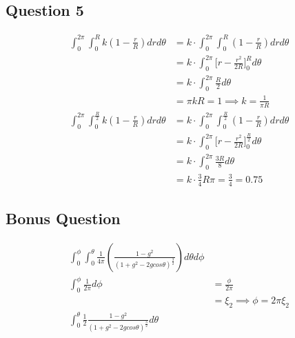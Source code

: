 \documentclass{article}
\begin{document}
\newpage
\subsection*{Question 5}
\begin{align}
    \int_0^{2\pi} \int_0^R k(1-\frac{r}{R})drd\theta & = k\cdot \int_0^{2\pi} \int_0^R (1-\frac{r}{R})drd\theta\\
    & = k\cdot \int_0^{2\pi} \lbrack r - \frac{r^2}{2R}\rbrack ^R_0 d\theta\\
    & = k\cdot \int_0^{2\pi} \frac{R}{2} d\theta\\
    & = \pi kR = 1 \implies k = \frac{1}{\pi R}\\
    \int_0^{2\pi} \int_0^{\frac{R}{2}} k(1-\frac{r}{R})drd\theta & = k\cdot \int_0^{2\pi} \int_0^{\frac{R}{2}} (1-\frac{r}{R})drd\theta\\
    & = k\cdot \int_0^{2\pi} \lbrack r - \frac{r^2}{2R}\rbrack ^{\frac{R}{2}}_0 d\theta\\
    & = k\cdot \int_0^{2\pi} \frac{3R}{8} d\theta\\
    & = k\cdot \frac{3}{4}R\pi = \frac{3}{4} = 0.75
\end{align}

\newpage
\subsection*{Bonus Question}
\begin{align}
    \int_0^{\phi} \int_0^{\theta} \frac{1}{4\pi} (\frac{1-g^2}{(1+g^2-2gcos\theta)^{\frac{3}{2}}}) d\theta d\phi\\
    \int_0^{\phi} \frac{1}{2\pi} d\phi &= \frac{\phi}{2\pi}\\
    &= \xi_2 \implies \phi=2\pi \xi_2\\
    \int_0^{\theta} \frac{1}{2} \frac{1-g^2}{(1+g^2-2gcos\theta)^{\frac{3}{2}}} d\theta
\end{align}
\end{document}
